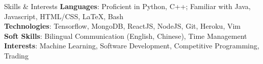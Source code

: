 \documentclass{resume} %
\begin{document}

\begin{rSection}{Skills \& Interests}
{\bf Languages}:
Proficient in Python, C++; Familiar with Java, Javascript, HTML/CSS, LaTeX, Bash \\
{\bf Technologies}:
Tensorflow, MongoDB, ReactJS, NodeJS, Git, Heroku, Vim\\
{\bf Soft Skills}:
Bilingual Communication (English, Chinese), Time Management\\
{\bf Interests}:
Machine Learning, Software Development, Competitive Programming, Trading
\end{rSection}



\end{document}
